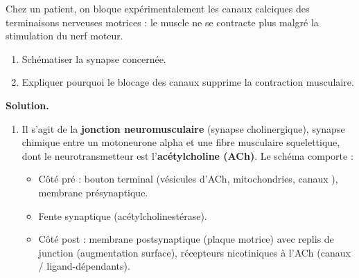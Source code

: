 \documentclass[11pt]{article}
\begin{document}
\begin{exoresolu}
Chez un patient, on bloque expérimentalement les canaux calciques des terminaisons nerveuses motrices : le muscle ne se contracte plus malgré la stimulation du nerf moteur.
\begin{enumerate}
\item Schématiser la synapse concernée.
\item Expliquer pourquoi le blocage des canaux  supprime la contraction musculaire.
\end{enumerate}
\tcblower
\textbf{Solution.}
\begin{enumerate}
\item Il s'agit de la \textbf{jonction neuromusculaire} (synapse cholinergique), synapse chimique entre un motoneurone alpha et une fibre musculaire squelettique, dont le neurotransmetteur est l'\textbf{acétylcholine (ACh)}. Le schéma comporte :
\begin{itemize}
\item Côté pré : bouton terminal (vésicules d'ACh, mitochondries, canaux ), membrane présynaptique.
\item Fente synaptique (acétylcholinestérase).
\item Côté post : membrane postsynaptique (plaque motrice) avec replis de junction (augmentation surface), récepteurs nicotiniques à l'ACh (canaux / ligand-dépendants).
\end{itemize}


\end{enumerate}
\end{exoresolu}
\end{document}
